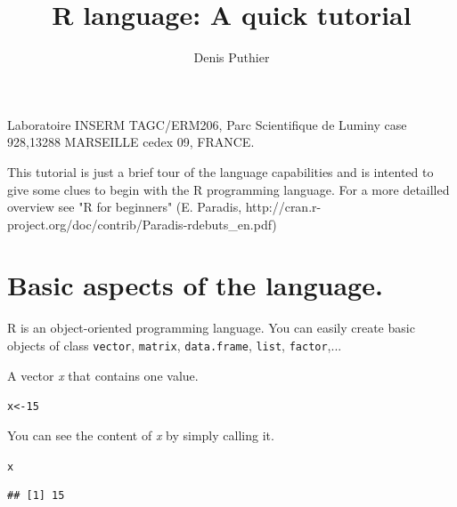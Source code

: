 \documentclass[10pt]{article}\usepackage[]{graphicx}\usepackage[]{color}
\makeatletter
\newcommand{\hlnum}[1]{\textcolor[rgb]{0.686,0.059,0.569}{#1}}%
\newcommand{\hlstd}[1]{\textcolor[rgb]{0.345,0.345,0.345}{#1}}%
\newcommand{\hlkwb}[1]{\textcolor[rgb]{0.69,0.353,0.396}{#1}}%
\newenvironment{kframe}{%
 \def\at@end@of@kframe{}%
 \ifinner\ifhmode%
  \def\at@end@of@kframe{\end{minipage}}%
  \begin{minipage}{\columnwidth}%
 \fi\fi%
 \def\FrameCommand##1{\hskip\@totalleftmargin \hskip-\fboxsep
 \colorbox{shadecolor}{##1}\hskip-\fboxsep
     \hskip-\linewidth \hskip-\@totalleftmargin \hskip\columnwidth}%
 \MakeFramed {\advance\hsize-\width
   \@totalleftmargin\z@ \linewidth\hsize
   \@setminipage}}%
 {\par\unskip\endMakeFramed%
 \at@end@of@kframe}
\newenvironment{knitrout}{}{} %
\newcommand{\Rfunction}[1]{{\texttt{#1}}}
\makeatother
\begin{document}
\title{\bf R language: A quick tutorial}
\author{Denis Puthier }
\maketitle

\begin{center}
Laboratoire INSERM TAGC/ERM206, Parc Scientifique de Luminy case 928,13288 MARSEILLE cedex 09, FRANCE.
\end{center}

\tableofcontents
\newpage

This tutorial is just a brief tour of the language capabilities and  is intented to give some clues to begin with the R programming language. For a more detailled overview see "R for beginners" (E. Paradis, http://cran.r-project.org/doc/contrib/Paradis-rdebuts\_en.pdf)
\bigskip


\section{Basic aspects of the language.}




R is an object-oriented programming language. You can easily create basic objects of class \Rfunction{vector}, \Rfunction{matrix},
\Rfunction{data.frame}, \Rfunction{list}, \Rfunction{factor},... \medskip

A vector \textit{x} that contains one value.


\begin{knitrout}
\color{fgcolor}\begin{kframe}
\begin{alltt}
\hlstd{x} \hlkwb{<-} \hlnum{15}
\end{alltt}
\end{kframe}
\end{knitrout}


\medskip
You can see the content of \textit{x} by simply calling it.

\begin{knitrout}
\color{fgcolor}\begin{kframe}
\begin{alltt}
\hlstd{x}
\end{alltt}
\begin{verbatim}
## [1] 15
\end{verbatim}
\end{kframe}
\end{knitrout}
\end{document}
